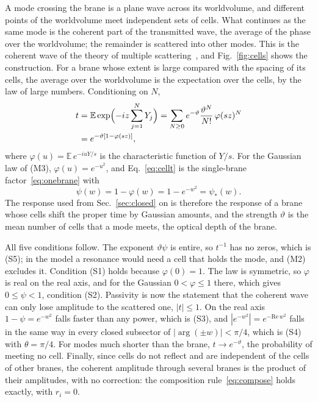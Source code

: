 \documentclass[aps,prd,10pt,twocolumn,superscriptaddress,nofootinbib,floatfix,longbibliography]{revtex4-2}
\newcommand{\bE}{\mathbb{E}}
\begin{document}
A mode crossing the brane is a plane wave across its worldvolume, and different points of the worldvolume meet independent sets of cells. What continues as the same mode is the coherent part of the transmitted wave, the average of the phase over the worldvolume; the remainder is scattered into other modes. This is the coherent wave of the theory of multiple scattering~\cite{Foldy1945,Lax1951}, and Fig.~\ref{fig:cells} shows the construction. For a brane whose extent is large compared with the spacing of its cells, the average over the worldvolume is the expectation over the cells, by the law of large numbers. Conditioning on $N$,
\begin{align}
t&=\bE\exp\Bigl(-iz\sum_{j=1}^NY_j\Bigr)=\sum_{N\ge0}e^{-\vartheta}\frac{\vartheta^N}{N!}\,\varphi(sz)^N\nonumber\\
&=e^{-\vartheta[1-\varphi(sz)]},\label{eq:cellt}
\end{align}
where $\varphi(u)=\bE\,e^{-iuY/s}$ is the characteristic function of $Y/s$. For the Gaussian law of (M3), $\varphi(u)=e^{-u^2}$, and Eq.~\eqref{eq:cellt} is the single-brane factor~\eqref{eq:onebrane} with
\begin{equation}
\label{eq:cellpsi}
\psi(w)=1-\varphi(w)=1-e^{-w^2}=\psi_*(w).
\end{equation}
The response used from Sec.~\ref{sec:closed} on is therefore the response of a brane whose cells shift the proper time by Gaussian amounts, and the strength $\vartheta$ is the mean number of cells that a mode meets, the optical depth of the brane.

All five conditions follow. The exponent $\vartheta\psi$ is entire, so $t^{-1}$ has no zeros, which is (S5); in the model a resonance would need a cell that holds the mode, and (M2) excludes it. Condition (S1) holds because $\varphi(0)=1$. The law is symmetric, so $\varphi$ is real on the real axis, and for the Gaussian $0<\varphi\le1$ there, which gives $0\le\psi<1$, condition (S2). Passivity is now the statement that the coherent wave can only lose amplitude to the scattered one, $|t|\le1$. On the real axis $1-\psi=e^{-w^2}$ falls faster than any power, which is (S3), and $|e^{-w^2}|=e^{-\mathrm{Re}\,w^2}$ falls in the same way in every closed subsector of $|\arg(\pm w)|<\pi/4$, which is (S4) with $\theta=\pi/4$. For modes much shorter than the brane, $t\to e^{-\vartheta}$, the probability of meeting no cell. Finally, since cells do not reflect and are independent of the cells of other branes, the coherent amplitude through several branes is the product of their amplitudes, with no correction: the composition rule~\eqref{eq:compose} holds exactly, with $r_i=0$.
\end{document}

